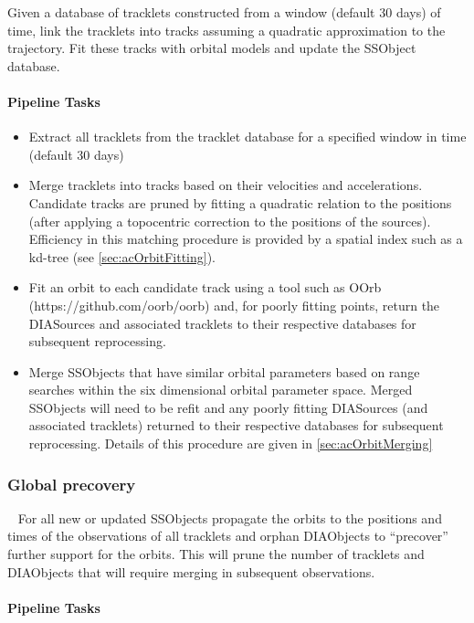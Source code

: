 Given a database of tracklets constructed from a window (default 30 days) of time, link the tracklets into tracks assuming a quadratic approximation to the trajectory. Fit these tracks with orbital models and update the SSObject database.

\paragraph{Pipeline Tasks}

\begin{itemize}
\item Extract all tracklets from the tracklet database for a specified window in time (default 30 days)
\item Merge tracklets into tracks based on their velocities and accelerations. Candidate tracks are pruned by fitting a quadratic relation to the positions (after applying a topocentric correction to the positions of the sources). Efficiency in this matching procedure is provided by a spatial index such as a kd-tree (see \ref{sec:acOrbitFitting}). 
\item Fit an orbit to each candidate track using a tool such as OOrb (https://github.com/oorb/oorb) and, for poorly fitting  points, return the DIASources and associated tracklets to their respective databases for subsequent reprocessing.
\item Merge SSObjects that have similar orbital parameters based on range searches within the six dimensional orbital parameter space.  Merged SSObjects will need to be refit and any poorly fitting DIASources (and associated tracklets) returned  to their respective databases for subsequent reprocessing. Details of this procedure are given in \ref{sec:acOrbitMerging}
\end{itemize}

\subsubsection{Global precovery}~
For all new or updated SSObjects propagate the orbits to the positions and times of the observations of all tracklets and orphan DIAObjects to ``precover'' further support for the orbits. This will prune the number of tracklets and DIAObjects that will require merging in subsequent observations. 

\paragraph{Pipeline Tasks}

